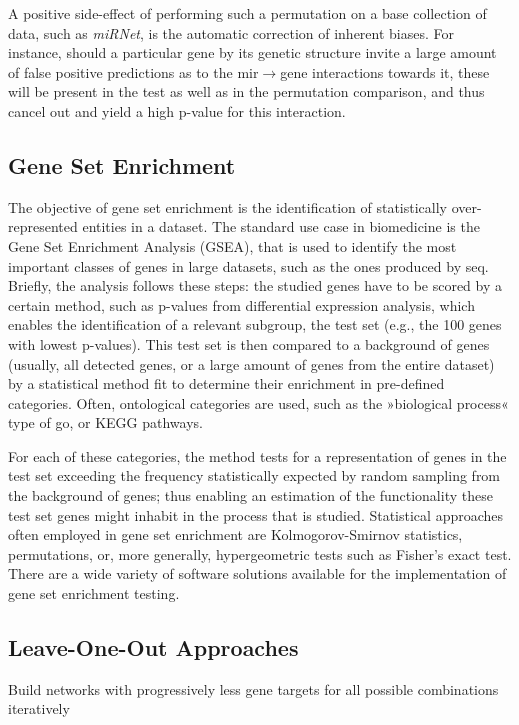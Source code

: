A positive side-effect of performing such a permutation on a base collection of data, such as \textit{miRNet}, is the automatic correction of inherent biases. For instance, should a particular gene by its genetic structure invite a large amount of false positive predictions as to the \ac{mir}$\to$gene interactions towards it, these will be present in the test as well as in the permutation comparison, and thus cancel out and yield a high p-value for this interaction.

\subsection{Gene Set Enrichment}
The objective of gene set enrichment is the identification of statistically over-represented entities in a dataset. The standard use case in biomedicine is the Gene Set Enrichment Analysis (GSEA), that is used to identify the most important classes of genes in large datasets, such as the ones produced by \ac{seq}. Briefly, the analysis follows these steps: the studied genes have to be scored by a certain method, such as p-values from differential expression analysis, which enables the identification of a relevant subgroup, the test set (e.g., the 100 genes with lowest p-values). This test set is then compared to a background of genes (usually, all detected genes, or a large amount of genes from the entire dataset) by a statistical method fit to determine their enrichment in pre-defined categories. Often, ontological categories are used, such as the »biological process« type of \ac{go}, or KEGG pathways.

For each of these categories, the method tests for a representation of genes in the test set exceeding the frequency statistically expected by random sampling from the background of genes; thus enabling an estimation of the functionality these test set genes might inhabit in the process that is studied. Statistical approaches often employed in gene set enrichment are Kolmogorov-Smirnov statistics, permutations, or, more generally, hypergeometric tests such as Fisher's exact test. There are a wide variety of software solutions available for the implementation of gene set enrichment testing.

\subsection{Leave-One-Out Approaches}
Build networks with progressively less gene targets for all possible combinations iteratively

